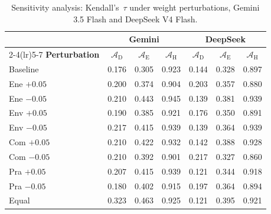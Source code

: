 \documentclass[final,3p,times]{elsarticle}
\begin{document}
\begin{table}[t]
\small
\centering
\renewcommand{\arraystretch}{1.10}
\caption{Sensitivity analysis: Kendall's~$\tau$ under weight perturbations, Gemini 3.5 Flash and DeepSeek V4 Flash.}
\label{tab:sensitivity_gemini}
\label{tab:sensitivity_deepseek}
\begin{tabular}{@{}l ccc ccc@{}}
\toprule
 & \multicolumn{3}{c}{Gemini} & \multicolumn{3}{c}{DeepSeek} \\
\cmidrule(lr){2-4}\cmidrule(lr){5-7}
\textbf{Perturbation} & $\mathcal{A}_{\text{D}}$ & $\mathcal{A}_{\text{E}}$ & $\mathcal{A}_{\text{H}}$ & $\mathcal{A}_{\text{D}}$ & $\mathcal{A}_{\text{E}}$ & $\mathcal{A}_{\text{H}}$ \\
\midrule
Baseline      & 0.176 & 0.305 & 0.923 & 0.144 & 0.328 & 0.897 \\
Ene $+0.05$   & 0.200 & 0.374 & 0.904 & 0.203 & 0.357 & 0.880 \\
Ene $-0.05$   & 0.210 & 0.443 & 0.945 & 0.139 & 0.381 & 0.939 \\
Env $+0.05$   & 0.190 & 0.385 & 0.921 & 0.176 & 0.350 & 0.891 \\
Env $-0.05$   & 0.217 & 0.415 & 0.939 & 0.139 & 0.364 & 0.939 \\
Com $+0.05$   & 0.210 & 0.422 & 0.932 & 0.142 & 0.388 & 0.928 \\
Com $-0.05$   & 0.210 & 0.392 & 0.901 & 0.217 & 0.327 & 0.860 \\
Pra $+0.05$   & 0.207 & 0.415 & 0.939 & 0.121 & 0.344 & 0.918 \\
Pra $-0.05$   & 0.180 & 0.402 & 0.915 & 0.197 & 0.364 & 0.894 \\
Equal         & 0.323 & 0.463 & 0.925 & 0.121 & 0.395 & 0.921 \\
\bottomrule
\end{tabular}
\renewcommand{\arraystretch}{1.0}
\end{table}
\end{document}
